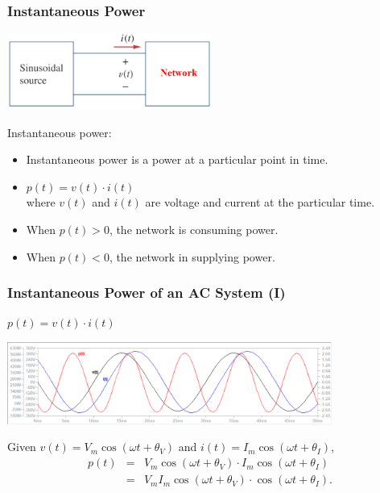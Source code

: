 \documentclass{beamer}
\begin{document}
\begin{frame}[fragile]
\frametitle{Instantaneous Power}

\begin{center}
\includegraphics[width=2.65in]{src/Fig03a.png}
\end{center}

Instantaneous power:
\begin{itemize}
\item Instantaneous power is a power at a particular point in time.
\item $p(t) = v(t) \cdot i(t)$
\\ where $v(t)$ and $i(t)$ are voltage and current at the particular time. 
\item When $p(t) > 0$, the network is consuming power.
\item When $p(t) < 0$, the network in supplying power.
\end{itemize}

\end{frame}


\begin{frame}[fragile]
\frametitle{Instantaneous Power of an AC System (I)}

\begin{center}
$p(t) = v(t) \cdot i(t)$
\end{center}

\begin{center}
\includegraphics[width=0.8\textwidth]{src/Fig04a.png}
\end{center}

Given $v(t) = V_m \cos(\omega t + \theta_V)$ 
and $i(t) = I_m \cos(\omega t + \theta_I)$,
%
\begin{eqnarray}
p(t) &=& V_m \cos(\omega t + \theta_V) \cdot I_m \cos(\omega t + \theta_I)
\nonumber \\
&=& V_m I_m \cos(\omega t + \theta_V) \cdot \cos(\omega t + \theta_I)
\nonumber .
\end{eqnarray}

\end{frame}
\end{document}
